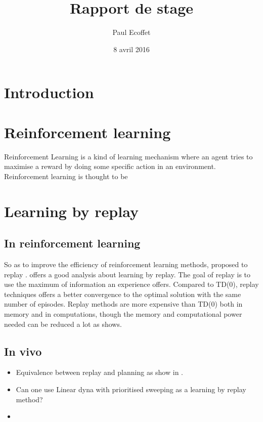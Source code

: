 \documentclass[]{article}
\title{Rapport de stage}
\author{Paul Ecoffet}
\date{8 avril 2016}
\begin{document}
\maketitle

{
\hypersetup{linkcolor=black}
\setcounter{tocdepth}{3}
\tableofcontents
}
\section{Introduction}\label{introduction}

\section{Reinforcement learning}\label{reinforcement-learning}

Reinforcement Learning is a kind of learning mechanism where an agent tries to maximise a reward by doing some specific action in an environment. Reinforcement learning is thought to be

\section{Learning by replay}\label{learning-by-replay}

\subsection{In reinforcement learning}
\label{sub:In reinforcement learning}

So as to improve the efficiency of reinforcement learning methods,  proposed to replay . \cite{vanseijen_deeper_2015} offers a good analysis about learning by replay. The goal of replay is to use the maximum of information an experience offers. Compared to TD(0), replay techniques offers a better convergence to the optimal solution with the same number of episodes. Replay methods are more expensive than TD(0) both in memory and in computations, though the memory and computational power needed can be reduced a lot as \cite{vanseijen_deeper_2015} shows.

\subsection{In vivo}
\label{sub:In vivo}

\cite{gupta_hippocampal_2010}

\begin{itemize}
\itemsep1pt\parskip0pt
\item
  Equivalence between replay and planning as show in \cite{vanseijen_deeper_2015}.
\item
  Can one use Linear dyna with prioritised sweeping as a learning by replay method?
\item

\end{itemize}
\end{document}
